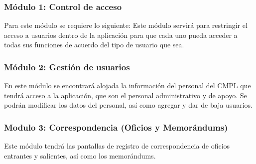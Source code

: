\subsubsection{Módulo 1: Control de acceso}
Para este módulo se requiere lo siguiente: 
Este módulo servirá para restringir el acceso a usuarios dentro de la aplicación para que cada uno pueda acceder a todas sus funciones de acuerdo del tipo de usuario que sea.\\ %

\subsubsection{Módulo 2: Gestión de usuarios}
En este módulo se encontrará alojada la información del personal del CMPL que tendrá acceso a la aplicación, que son el personal administrativo y de apoyo. Se podrán modificar los datos del personal, así como agregar y dar de baja usuarios. \\ %

\subsubsection{Modulo 3: Correspondencia (Oficios y Memorándums)}
Este módulo tendrá las pantallas de registro de correspondencia de oficios entrantes y salientes, así como los memorándums.\\ %

